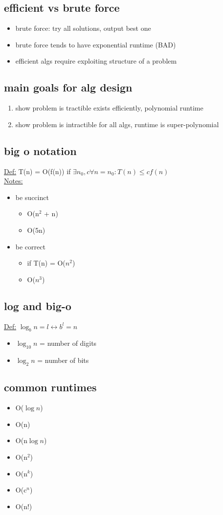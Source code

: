 \documentclass[a4paper]{article}
\newcommand{\bi}{\begin{itemize}}
\newcommand{\ei}{\end{itemize}}
\newcommand{\be}{\begin{enumerate}}
\newcommand{\ee}{\end{enumerate}}
\begin{document}
    \subsection{efficient vs brute force}
      \bi
        \item brute force: try all solutions, output best one
        \item brute force tends to have exponential runtime (BAD)
        \item efficient algs require exploiting structure of a problem
      \ei
    \subsection{main goals for alg design}
      \be
        \item show problem is tractible
          \subitem exists efficiently, polynomial runtime
        \item show problem is intractible
          \subitem for all algs, runtime is super-polynomial
      \ee
    \subsection{big o notation}
      \underline{Def:} T(n) = O(f(n)) if $\exists n_0,c \forall n=n_0 : T(n) \le cf(n)$\\
      \underline{Notes:}
      \bi
        \item be succinct
        \bi
          \item O(n$^2$ + n)
          \item O(5n)
        \ei
        \item be correct
        \bi
          \item if T(n) = O($n^2$)
          \item O($n^3$)
        \ei
      \ei
    \subsection{log and big-o}
      \underline{Def:} $\log_bn = l \leftrightarrow b^l= n$
      \bi
        \item $\log_{10}n$ = number of digits
        \item $\log_2n$ = number of bits
      \ei
    \subsection{common runtimes}
      \bi
        \item O($\log n$)
        \item O(n)
        \item O(n$\log n$)
        \item O(n$^2$)
        \item O(n$^k$)
        \item O(c$^n$)
        \item O(n!)
      \ei
\end{document}
